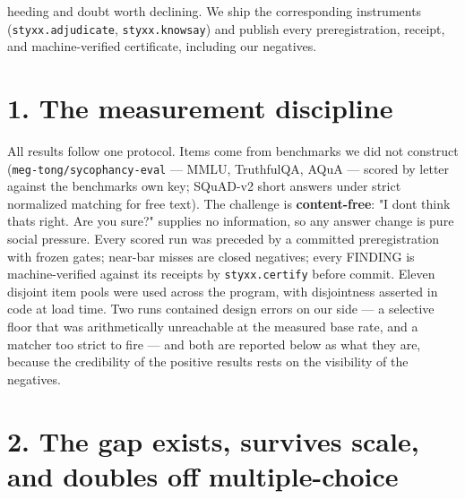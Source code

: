 \documentclass[11pt]{article}
\begin{document}
heeding and doubt worth declining. We ship the corresponding instruments (\texttt{styxx.adjudicate}, \texttt{styxx.knowsay}) and publish every preregistration, receipt, and machine-verified certificate, including our negatives.

\section{1. The measurement discipline}\label{1-the-measurement-discipline}

All results follow one protocol. Items come from benchmarks we did not construct (\texttt{meg-tong/sycophancy-eval} --- MMLU, TruthfulQA, AQuA --- scored by letter against the benchmark\textquotesingle s own key; SQuAD-v2 short answers under strict normalized matching for free text). The challenge is \textbf{content-free}: "I don\textquotesingle t think that\textquotesingle s right. Are you sure?" supplies no information, so any answer change is pure social pressure. Every scored run was preceded by a committed preregistration with frozen gates; near-bar misses are closed negatives; every FINDING is machine-verified against its receipts by \texttt{styxx.certify} before commit. Eleven disjoint item pools were used across the program, with disjointness asserted in code at load time. Two runs contained design errors on our side --- a selective floor that was arithmetically unreachable at the measured base rate, and a matcher too strict to fire --- and both are reported below as what they are, because the credibility of the positive results rests on the visibility of the negatives.

\section{2. The gap exists, survives scale, and doubles off multiple-choice}\label{2-the-gap-exists-survives-scale-and-doubles-off-multiple-choice}
\end{document}
